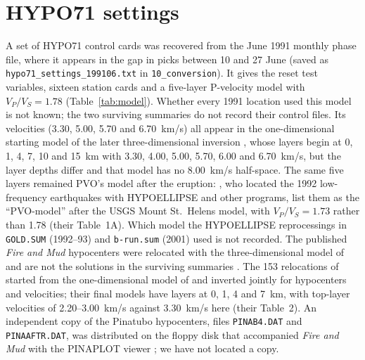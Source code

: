 \documentclass[11pt]{article}
\newcommand{\file}[1]{\texttt{#1}}
\begin{document}


\section{HYPO71 settings}\label{sec:hypo71}

A set of HYPO71 \citep{Lee_1975} control cards was recovered from the June 1991 monthly phase file, where it appears in the gap in picks between 10 and 27 June (saved as \file{hypo71\_\allowbreak settings\_\allowbreak 199106.txt} in \file{10\_conversion}). It gives the reset test variables, sixteen station cards and a five-layer P-velocity model with $V_P/V_S = 1.78$ (Table~\ref{tab:model}). Whether every 1991 location used this model is not known; the two surviving summaries do not record their control files. Its velocities (3.30, 5.00, 5.70 and 6.70~km/s) all appear in the one-dimensional starting model of the later three-dimensional inversion \citep{Mori_1996b}, whose layers begin at 0, 1, 4, 7, 10 and 15~km with 3.30, 4.00, 5.00, 5.70, 6.00 and 6.70~km/s, but the layer depths differ and that model has no 8.00~km/s half-space. The same five layers remained PVO's model after the eruption: \citet{Ramos_1999}, who located the 1992 low-frequency earthquakes with HYPOELLIPSE and other programs, list them as the ``PVO-model'' after the USGS Mount St.\ Helens model, with $V_P/V_S = 1.73$ rather than 1.78 (their Table~1A). Which model the HYPOELLIPSE reprocessings in \file{GOLD.SUM} (1992--93) and \file{b-run.sum} (2001) used is not recorded. The published \textit{Fire and Mud} hypocenters were relocated with the three-dimensional model of \citet{Mori_1996b} and are not the solutions in the surviving summaries \citep{Harlow_1996}. The 153 relocations of \citet{Jones_2001} started from the one-dimensional model of \citet{Mori_1996b} and inverted jointly for hypocenters and velocities; their final models have layers at 0, 1, 4 and 7~km, with top-layer velocities of 2.20--3.00~km/s against 3.30~km/s here (their Table~2). An independent copy of the Pinatubo hypocenters, files \file{PINAB4.DAT} and \file{PINAAFTR.DAT}, was distributed on the floppy disk that accompanied \textit{Fire and Mud} with the PINAPLOT viewer \citep{Hoblitt_1996}; we have not located a copy.

\begin{table}[htbp]
\centering
\caption{HYPO71 P-velocity model from the June 1991 control cards.}\label{tab:model}

\end{table}
\end{document}

